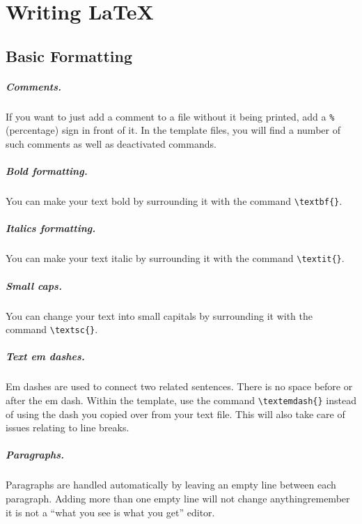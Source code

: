 \chapter{Writing \LaTeX{}} \label{c1_firstchapter:cha}

\section{Basic Formatting}\label{c1_basicformatting:sec}

\paragraph{Comments.} If you want to just add a comment to a file without it
being printed, add a \lstinline[language=Tex]!%! (percentage) sign in front of
it. In the template files, you will find a number of such
comments as well as deactivated commands.

\paragraph{Bold formatting.} You can make your text bold by surrounding it
with the command \lstinline[language=Tex]!\textbf{}!.

\paragraph{Italics formatting.} You can make your text italic by surrounding
it with the command \lstinline[language=Tex]!\textit{}!.

\paragraph{Small caps.} You can change your text into small capitals by
surrounding it with the command \lstinline[language=Tex]!\textsc{}!.
    
\paragraph{Text em dashes.} Em dashes are used to connect two related sentences.
There is no space before or after the em dash. Within the template, use the
command \lstinline[language=Tex]!\textemdash{}! instead of using the dash you
copied over from your text file. This will also take care of issues relating to
line breaks.

\paragraph{Paragraphs.} Paragraphs are handled automatically by leaving an empty
line between each paragraph. Adding more than one empty line will not change
anything\textemdash{}remember it is not a ``what you see is what you get''
editor.

